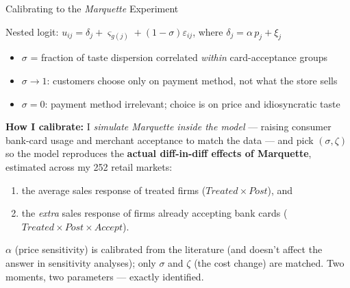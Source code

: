 \documentclass[11pt, aspectratio=169]{beamer}
\begin{document}
\begin{frame}{Calibrating to the \emph{Marquette} Experiment}

\small
Nested logit: \quad $u_{ij} = \delta_j + \varsigma_{g(j)} + (1-\sigma)\varepsilon_{ij}$, \quad where $\delta_j = \alpha \, p_j + \xi_j$

\begin{itemize}\setlength\itemsep{0.1em}
    \item $\sigma$ = fraction of taste dispersion correlated \emph{within} card-acceptance groups
    \item $\sigma \to 1$: customers choose only on payment method, not what the store sells
    \item $\sigma = 0$: payment method irrelevant; choice is on price and idiosyncratic taste
\end{itemize}

\vspace{0.4em}
\textbf{How I calibrate:} I \emph{simulate Marquette inside the model} --- raising consumer bank-card usage and merchant acceptance to match the data --- and pick $(\sigma,\zeta)$ so the model reproduces the \textbf{actual diff-in-diff effects of Marquette}, estimated across my 252 retail markets:

\vspace{0.2em}
\begin{enumerate}\setlength\itemsep{0.1em}
    \item the average sales response of treated firms ($Treated\times Post$), and
    \item the \emph{extra} sales response of firms already accepting bank cards ($Treated\times Post\times Accept$).
\end{enumerate}

\vspace{0.2em}
{\footnotesize $\alpha$ (price sensitivity) is calibrated from the literature (and doesn't affect the answer in sensitivity analyses); only $\sigma$ and $\zeta$ (the cost change) are matched. Two moments, two parameters --- exactly identified.}

\end{frame}
\end{document}
